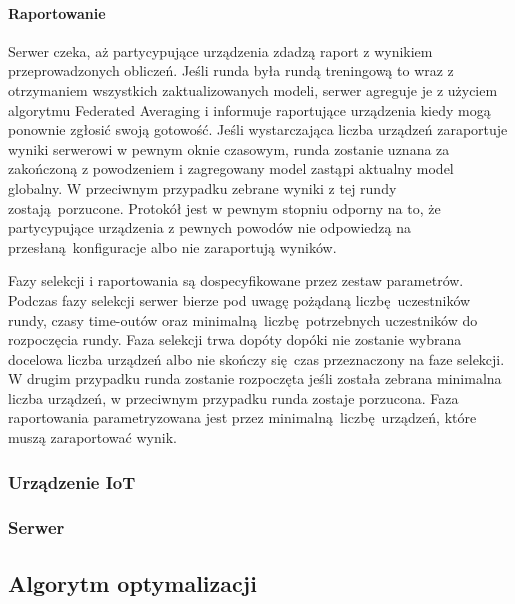\paragraph{Raportowanie}
Serwer czeka, aż partycypujące urządzenia zdadzą raport z wynikiem przeprowadzonych obliczeń. Jeśli runda była rundą treningową to wraz z otrzymaniem wszystkich zaktualizowanych modeli, serwer agreguje je z użyciem algorytmu Federated Averaging i informuje raportujące urządzenia kiedy mogą ponownie zgłosić swoją gotowość. Jeśli wystarczająca liczba urządzeń zaraportuje wyniki serwerowi w pewnym oknie czasowym, runda zostanie uznana za zakończoną z powodzeniem i zagregowany model zastąpi aktualny model globalny. W przeciwnym przypadku zebrane wyniki z tej rundy zostają porzucone. Protokół jest w pewnym stopniu odporny na to, że partycypujące urządzenia z pewnych powodów nie odpowiedzą na przesłaną konfiguracje albo nie zaraportują wyników.

Fazy selekcji i raportowania są dospecyfikowane przez zestaw parametrów. Podczas fazy selekcji  serwer bierze pod uwagę pożądaną liczbę uczestników rundy, czasy time-outów oraz minimalną liczbę potrzebnych uczestników do rozpoczęcia rundy. Faza selekcji trwa dopóty dopóki nie zostanie wybrana docelowa liczba urządzeń albo nie skończy się czas przeznaczony na faze selekcji. W drugim przypadku runda zostanie rozpoczęta jeśli została zebrana minimalna liczba urządzeń, w przeciwnym przypadku runda zostaje porzucona. Faza raportowania parametryzowana jest przez minimalną liczbę urządzeń, które muszą zaraportować wynik.

\subsubsection{Urządzenie IoT}


\subsubsection{Serwer}


\subsection{Algorytm optymalizacji}

